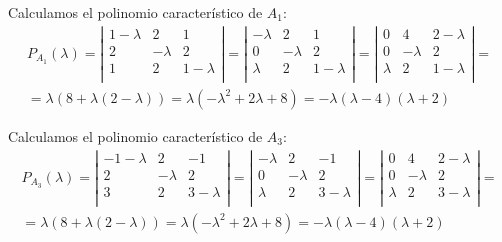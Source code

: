 \begin{ejercicio}
    Calculamos el polinomio característico de $A_1$:
    \begin{multline*}
        P_{A_1}(\lambda) = \left| \begin{array}{ccc}
            1-\lambda & 2 & 1 \\
            2 & -\lambda & 2 \\
            1 & 2 & 1-\lambda \\
        \end{array}\right|
        = \left| \begin{array}{ccc}
            -\lambda & 2 & 1 \\
            0 & -\lambda & 2 \\
            \lambda & 2 & 1-\lambda \\
        \end{array}\right|
        = \left| \begin{array}{ccc}
            0 & 4 & 2-\lambda \\
            0 & -\lambda & 2 \\
            \lambda & 2 & 1-\lambda \\
        \end{array}\right| =\\=
        \lambda(8+\lambda(2-\lambda)) = \lambda(-\lambda^2+2\lambda+8)=-\lambda(\lambda-4)(\lambda+2)
    \end{multline*}

    Calculamos el polinomio característico de $A_3$:
    \begin{multline*}
        P_{A_3}(\lambda) = \left| \begin{array}{ccc}
            -1-\lambda & 2 & -1 \\
            2 & -\lambda & 2 \\
            3 & 2 & 3-\lambda \\
        \end{array}\right|
        = \left| \begin{array}{ccc}
            -\lambda & 2 & -1 \\
            0 & -\lambda & 2 \\
            \lambda & 2 & 3-\lambda \\
        \end{array}\right|
        = \left| \begin{array}{ccc}
            0 & 4 & 2-\lambda \\
            0 & -\lambda & 2 \\
            \lambda & 2 & 3-\lambda \\
        \end{array}\right| =\\=
        \lambda(8+\lambda(2-\lambda)) = \lambda(-\lambda^2+2\lambda+8)=-\lambda(\lambda-4)(\lambda+2)
    \end{multline*}


\end{ejercicio}
